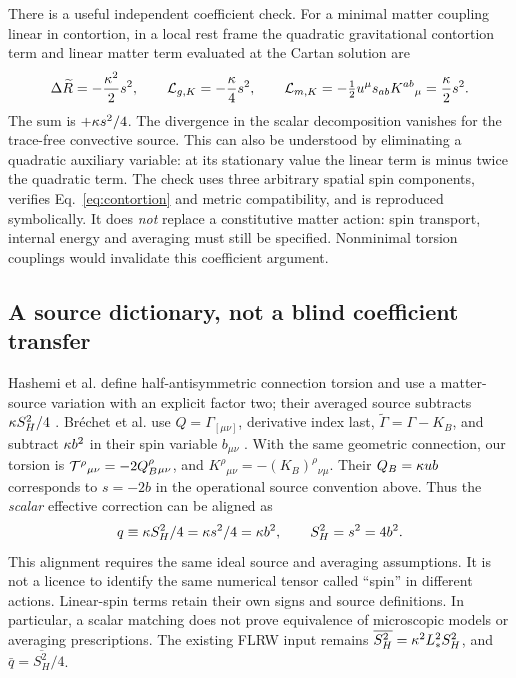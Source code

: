 There is a useful independent coefficient check. For a minimal matter coupling linear in contortion, in a local rest frame the quadratic gravitational contortion term and linear matter term evaluated at the Cartan solution are
\begin{equation}
 \Delta\widetilde R=-\frac{\kappa^2}{2}s^2,\qquad
 \mathcal L_{g,K}=-\frac{\kappa}4s^2,\qquad
 \mathcal L_{m,K}=-\tfrac12u^\mu s_{ab}K^{ab}{}_{\mu}=\frac{\kappa}2s^2.
\end{equation}
The sum is $+\kappa s^2/4$. The divergence in the scalar decomposition vanishes for the trace-free convective source. This can also be understood by eliminating a quadratic auxiliary variable: at its stationary value the linear term is minus twice the quadratic term. The check uses three arbitrary spatial spin components, verifies Eq.~\eqref{eq:contortion} and metric compatibility, and is reproduced symbolically. It does \emph{not} replace a constitutive matter action: spin transport, internal energy and averaging must still be specified. Nonminimal torsion couplings would invalidate this coefficient argument.

\subsection{A source dictionary, not a blind coefficient transfer}
Hashemi et al. define half-antisymmetric connection torsion and use a matter-source variation with an explicit factor two; their averaged source subtracts $\kappa S_H^2/4$ \cite{Hashemi}. Br\'echet et al. use $Q=\Gamma_{[\mu\nu]}$, derivative index last, $\widetilde\Gamma=\Gamma-K_B$, and subtract $\kappa b^2$ in their spin variable $b_{\mu\nu}$ \cite{BHL}. With the same geometric connection, our torsion is $\mathcal T^\rho{}_{\mu\nu}=-2Q_B^\rho{}_{\mu\nu}$, and $K^\rho{}_{\mu\nu}=-(K_B)^\rho{}_{\nu\mu}$. Their $Q_B=\kappa u b$ corresponds to $s=-2b$ in the operational source convention above. Thus the \emph{scalar} effective correction can be aligned as
\begin{equation}\label{eq:dictionary}
 q\equiv\kappa S_H^2/4=\kappa s^2/4=\kappa b^2,\qquad S_H^2=s^2=4b^2.
\end{equation}
This alignment requires the same ideal source and averaging assumptions. It is not a licence to identify the same numerical tensor called ``spin'' in different actions. Linear-spin terms retain their own signs and source definitions. In particular, a scalar matching does not prove equivalence of microscopic models or averaging prescriptions. The existing FLRW input remains $\overline{S_H^2}=\kappa^2L_*^2 S_H^2$, and $\bar q=\overline{S_H^2}/4$.

